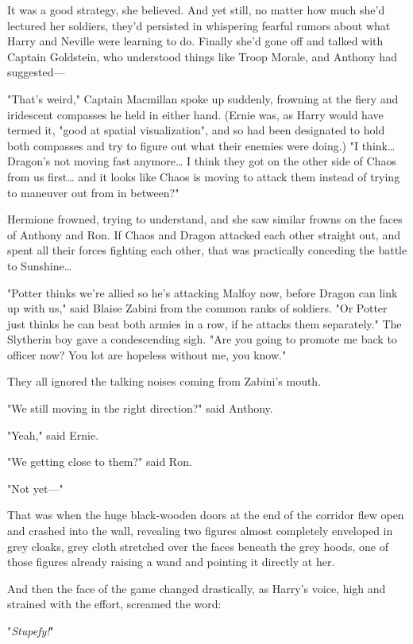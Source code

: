 It was a good strategy, she believed. And yet still, no matter how much she'd 
lectured her soldiers, they'd persisted in whispering fearful rumors about what 
Harry and Neville were learning to do. Finally she'd gone off and talked with 
Captain Goldstein, who understood things like Troop Morale, and Anthony had 
suggested---

"That's weird," Captain Macmillan spoke up suddenly, frowning at the fiery and 
iridescent compasses he held in either hand. (Ernie was, as Harry would have 
termed it, "good at spatial visualization", and so had been designated to hold 
both compasses and try to figure out what their enemies were doing.) "I 
think{\ldots} Dragon's not moving fast anymore{\ldots} I think they got on the 
other side of Chaos from us first{\ldots} and it looks like Chaos is moving to 
attack them instead of trying to maneuver out from in between?"

Hermione frowned, trying to understand, and she saw similar frowns on the faces 
of Anthony and Ron. If Chaos and Dragon attacked each other straight out, and 
spent all their forces fighting each other, that was practically conceding the 
battle to Sunshine{\ldots}

"Potter thinks we're allied so he's attacking Malfoy now, before Dragon can 
link up with us," said Blaise Zabini from the common ranks of soldiers. "Or 
Potter just thinks he can beat both armies in a row, if he attacks them 
separately." The Slytherin boy gave a condescending sigh. "Are you going to 
promote me back to officer now? You lot are hopeless without me, you know."

They all ignored the talking noises coming from Zabini's mouth.

"We still moving in the right direction?" said Anthony.

"Yeah," said Ernie.

"We getting close to them?" said Ron.

"Not yet---"

That was when the huge black-wooden doors at the end of the corridor flew open 
and crashed into the wall, revealing two figures almost completely enveloped in 
grey cloaks, grey cloth stretched over the faces beneath the grey hoods, one of 
those figures already raising a wand and pointing it directly at her.

And then the face of the game changed drastically, as Harry's voice, high and 
strained with the effort, screamed the word:

"\emph{Stupefy!}"

